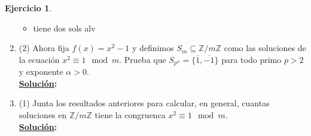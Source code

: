 \documentclass[11pt,letterpaper]{article}
\theoremstyle{definition}\newtheorem{p}{Ejercicio}
\newcommand{\Z}{\mathbb{Z}}
\newcommand{\sol}{\textbf{\underline{Solución}: }} %
\begin{document}
\begin{p}
\begin{enumerate}
\begin{itemize}
      \item tiene dos sols alv
    \end{itemize}

    \item(2) Ahora fija $f(x)=x^2-1$ y definimos $S_m\subseteq\Z/m\Z$ como las soluciones de la
    ecuaci\'on $x^2\equiv 1\mod m$. Prueba que $S_{p^{\alpha}}=\{\overline{1},\overline{-1}\}$ para
    todo primo $p>2$ y exponente $\alpha>0$.\\
    \sol

    \item(1) Junta los resultados anteriores para calcular, en general, cuantas soluciones en $\Z/m\Z$
    tiene la congruenca $x^2\equiv 1\mod m$.\\
    \sol
\end{enumerate}

\end{p}
\end{document}
